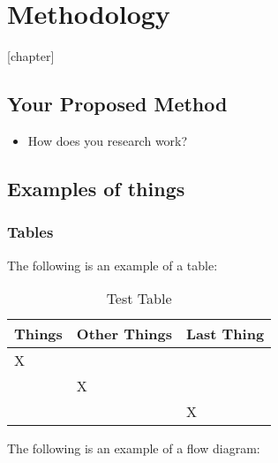 
\glsresetall %
\chapter[Methodology]{Methodology}\label{ch:Methodology}

[chapter]

\section{Your Proposed Method}
\begin{itemize}
	\item{How does you research work?}
\end{itemize}

\section[Examples]{Examples of things}

\subsection{Tables}
The following is an example of a table:

\begin{table}[!htbp]
	\centering
	\begin{tabular}{|l|l|l|} %
		\hline
		Things & Other Things & Last Thing \\
		\hline
		X & ~ & ~ \\
		\hline
		~ & X & ~ \\
		\hline
		~ & ~ & X \\
		\hline
	\end{tabular}
	\caption{Test Table}
	\label{tab.testTable}
\end{table}

\clearpage

The following is an example of a flow diagram:  

